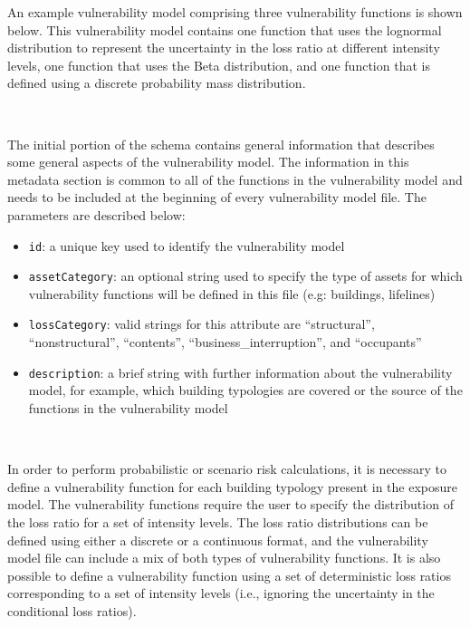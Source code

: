 An example \gls{vulnerability model} comprising three \glspl{vulnerability
function} is shown below. This \gls{vulnerability model} contains one function
that uses the lognormal distribution to represent the uncertainty in the loss
ratio at different intensity levels, one function that uses the Beta
distribution, and one function that is defined using a discrete probability
mass distribution.

\inputminted[firstline=1,firstnumber=1,fontsize=\footnotesize,frame=single,linenos,bgcolor=lightgray]{xml}{oqum/risk/Verbatim/input_vulnerability.xml}\\


The initial portion of the schema contains general information that describes
some general aspects of the \gls{vulnerability model}. The information in this
metadata section is common to all of the functions in the \gls{vulnerability
model} and needs to be included at the beginning of every \gls{vulnerability
model} file. The parameters are described below:

\begin{itemize}

    \item \Verb+id+: a unique key used to identify the \gls{vulnerability model}

    \item \Verb+assetCategory+: an optional string used to specify the type of
    \glspl{asset} for which \glspl{vulnerability function} will be defined in this file 
    (e.g: buildings, lifelines)

    \item \Verb+lossCategory+: valid strings for this attribute are 
    ``structural'', ``nonstructural'', ``contents'',  
    ``business\_interruption'', and ``occupants''

    \item \Verb+description+: a brief string with further information about the
    \gls{vulnerability model}, for example, which building typologies are 
    covered or the source of the functions in the \gls{vulnerability model}

\end{itemize}

\inputminted[firstline=4,firstnumber=4,lastline=8,fontsize=\footnotesize,frame=single,linenos,bgcolor=lightgray]{xml}{oqum/risk/Verbatim/input_vulnerability.xml}\\


In order to perform probabilistic or scenario risk calculations, it is
necessary to define a \gls{vulnerability function} for each building typology
present in the exposure model. The \glspl{vulnerability function} require the
user to specify the distribution of the loss ratio for a set of intensity
levels. The loss ratio distributions can be defined using either a discrete or
a continuous format, and the \gls{vulnerability model} file can include a mix
of both types of \glspl{vulnerability function}. It is also possible to define
a vulnerability function using a set of deterministic loss ratios
corresponding to a set of intensity levels (i.e., ignoring the uncertainty in
the conditional loss ratios).

